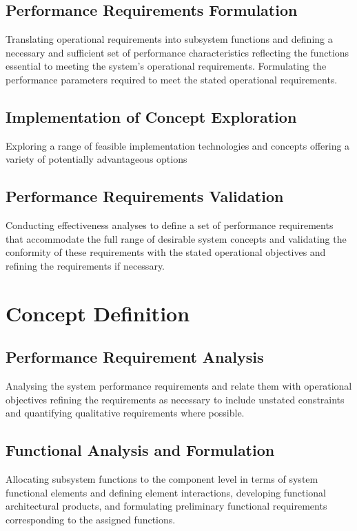 \documentclass[a4paper,11pt,fleqn]{report}
\begin{document}
\section{Performance Requirements Formulation}
Translating operational requirements into subsystem functions and defining a necessary and sufficient set of performance characteristics reflecting the functions essential to meeting the system’s operational requirements. Formulating the performance parameters required to meet the stated operational requirements.

\section{Implementation of Concept Exploration}
Exploring a range of feasible implementation technologies and concepts offering a variety of potentially advantageous options 

\section{Performance Requirements Validation}
Conducting effectiveness analyses to define a set of performance requirements that accommodate the full range of desirable system concepts and validating the conformity of these requirements with the stated operational objectives and refining the requirements if necessary. 

\chapter{Concept Definition}
\section{Performance Requirement Analysis}
Analysing the system performance requirements and relate them with operational objectives refining the requirements as necessary to include unstated constraints and quantifying qualitative requirements where possible. 

\section{Functional Analysis and Formulation} 
Allocating subsystem functions to the component level in terms of system functional elements and defining element interactions, developing functional architectural products, and formulating preliminary functional requirements corresponding to the assigned functions. 
\end{document}
